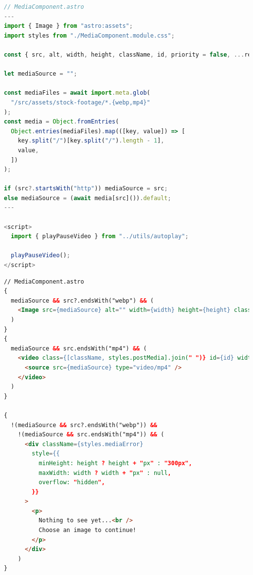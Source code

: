\documentclass[a4paper, 10pt]{article}
\begin{document}
\begin{lstlisting}[caption=MediaComponent in pure Astro (Frontmatter \& Script), label={lst:Astro:MediaComponent:Script}, language=JavaScript]
// MediaComponent.astro
---
import { Image } from "astro:assets";
import styles from "./MediaComponent.module.css";

const { src, alt, width, height, className, id, priority = false, ...rest } = Astro.props;

let mediaSource = "";

const mediaFiles = await import.meta.glob(
  "/src/assets/stock-footage/*.{webp,mp4}"
);
const media = Object.fromEntries(
  Object.entries(mediaFiles).map(([key, value]) => [
    key.split("/")[key.split("/").length - 1],
    value,
  ])
);

if (src?.startsWith("http")) mediaSource = src;
else mediaSource = (await media[src]()).default;
---

<script>
  import { playPauseVideo } from "../utils/autoplay";

  playPauseVideo();
</script>
\end{lstlisting}

\begin{lstlisting}[caption=MediaComponent in pure Astro (Template), label={lst:Astro:MediaComponent:Template}, language=HTML, firstnumber=29]
// MediaComponent.astro
{
  mediaSource && src?.endsWith("webp") && (
    <Image src={mediaSource} alt="" width={width} height={height} class={[className, styles.postMedia].join(" ")} id={id} loading={priority ? "eager" : "lazy"} {...rest} />
  )
}
{
  mediaSource && src.endsWith("mp4") && (
    <video class={[className, styles.postMedia].join(" ")} id={id} width={width} preload="metadata" controls controlslist="nodownload,nofullscreen,noremoteplayback" disable-picture-in-picture loop muted >
      <source src={mediaSource} type="video/mp4" />
    </video>
  )
}

{
  !(mediaSource && src?.endsWith("webp")) &&
    !(mediaSource && src.endsWith("mp4")) && (
      <div className={styles.mediaError}
        style={{
          minHeight: height ? height + "px" : "300px",
          maxWidth: width ? width + "px" : null,
          overflow: "hidden",
        }}
      >
        <p>
          Nothing to see yet...<br />
          Choose an image to continue!
        </p>
      </div>
    )
}
\end{lstlisting}
\end{document}
